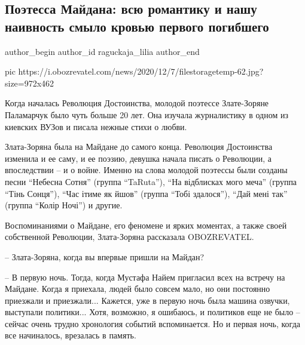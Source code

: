  
 
 
 
 
 
\subsection{Поэтесса Майдана: всю романтику и нашу наивность смыло кровью первого погибшего}
\label{sec:07_12_2020.news.ua.obozrevatel.raguckaja_lilia.1.maidan2}
\ifcmt
	author_begin
   author_id raguckaja_lilia
	author_end
\fi

\ifcmt
pic https://i.obozrevatel.com/news/2020/12/7/filestoragetemp-62.jpg?size=972x462
\fi


Когда началась Революция Достоинства, молодой поэтессе Злате-Зоряне Паламарчук
было чуть больше 20 лет. Она изучала журналистику в одном из киевских ВУЗов и
писала нежные стихи о любви.

Злата-Зоряна была на Майдане до самого конца. Революция Достоинства изменила и
ее саму, и ее поэзию, девушка начала писать о Революции, а впоследствии – и о
войне. Именно на слова молодой поэтессы были созданы песни \enquote{Небесна
Сотня} (группа \enquote{TaRuta}), \enquote{На відблисках мого меча} (группа
\enquote{Тінь Сонця}), \enquote{Час ітиме як йшов} (группа \enquote{Тобі
здалося}), \enquote{Дай мені так} (группа \enquote{Колір Ночі}) и другие.

Воспоминаниями о Майдане, его феномене и ярких моментах, а также своей
собственной Революции, Злата-Зоряна рассказала OBOZREVATEL.

– Злата-Зоряна, когда вы впервые пришли на Майдан?

– В первую ночь. Тогда, когда Мустафа Найем пригласил всех на встречу на
Майдане. Когда я приехала, людей было совсем мало, но они постоянно приезжали и
приезжали... Кажется, уже в первую ночь была машина озвучки, выступали
политики... Хотя, возможно, я ошибаюсь, и политиков еще не было – сейчас очень
трудно хронология событий вспоминается. Но и первая ночь, когда все начиналось,
врезалась в память.

